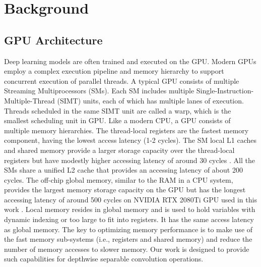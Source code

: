 
\section{Background}







\subsection{GPU Architecture\label{sec:ga}}
Deep learning models are often trained and executed on the GPU. Modern GPUs employ a complex execution pipeline and memory hierarchy to
support concurrent execution of parallel threads. A typical GPU consists of multiple Streaming Multiprocessors (SMs). Each SM includes
multiple Single-Instruction-Multiple-Thread (SIMT) units, each of which has multiple lanes of execution. Threads scheduled in the same SIMT
unit are called a warp, which is the smallest scheduling unit in GPU. Like a modern CPU, a GPU consists of multiple memory hierarchies. The
thread-local registers are the fastest memory component, having the lowest access latency (1-2 cycles). The SM local L1 caches and shared
memory provide a larger storage capacity over the thread-local registers but have modestly higher accessing latency of around 30 cycles
\cite{mei2016dissecting,jia2018dissecting}. All the SMs share a unified L2 cache that provides an accessing latency of about 200 cycles.
The off-chip global memory, similar to the RAM in a CPU system, provides the largest memory storage capacity on the GPU but has the longest
accessing latency of around 500 cycles on NVIDIA RTX 2080Ti GPU used in this work . Local memory
resides in global memory and is used to hold variables with dynamic indexing or too large to fit into registers. It has the same access
latency as global memory. The key to optimizing memory performance is to make use of the fast memory sub-systems (i.e., registers and
shared memory) and reduce the number of memory accesses to slower memory. Our work is designed to provide such capabilities for depthwise
separable convolution operations.


